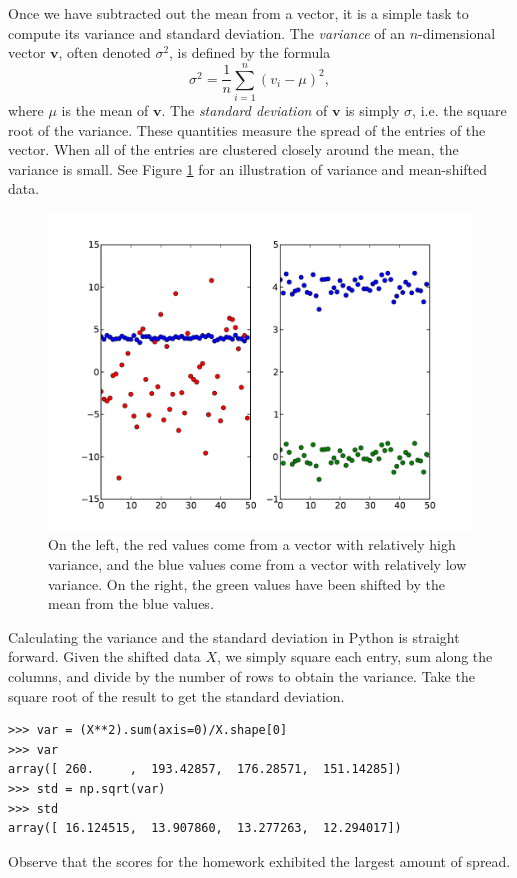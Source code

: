 Once we have subtracted out the mean from a vector, it is a simple task to compute its variance and standard deviation.
The \emph{variance} of an $n$-dimensional vector $\mathbf{v}$, often denoted $\sigma^2$, is defined by the formula
$$
\sigma^2 = \frac{1}{n}\displaystyle\sum_{i=1}^n (v_i - \mu)^2,
$$
where $\mu$ is the mean of $\mathbf{v}$. The \emph{standard deviation} of $\mathbf{v}$ is simply $\sigma$, i.e. the square
root of the variance. These quantities measure the spread of the entries of the vector. When all of the entries are clustered
closely around the mean, the variance is small. See Figure \ref{fig:variance} for an illustration of variance and mean-shifted data. 

\begin{figure}[h]
\includegraphics[width=\textwidth]{variance}
\caption{On the left, the red values come from a vector with relatively high variance,
         and the blue values come from a vector with relatively low variance.
         On the right, the green values have been shifted by the mean from the blue values.}
\label{fig:variance}
\end{figure}

Calculating the variance and the standard deviation in Python is straight forward.
Given the shifted data $X$, we simply square each entry, sum along the columns, and divide by the number of rows 
to obtain the variance. Take the square root of the result to get the standard deviation.
\begin{lstlisting}
>>> var = (X**2).sum(axis=0)/X.shape[0]
>>> var
array([ 260.     ,  193.42857,  176.28571,  151.14285])
>>> std = np.sqrt(var)
>>> std
array([ 16.124515,  13.907860,  13.277263,  12.294017])
\end{lstlisting}
Observe that the scores for the homework exhibited the largest amount of spread.


